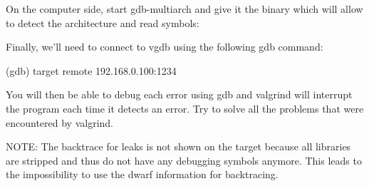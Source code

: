On the computer side, start gdb-multiarch and give it the 
binary which will allow to detect the architecture and read symbols:

Finally, we'll need to connect to vgdb using the following gdb command:
\begin{bashinput}
(gdb) target remote 192.168.0.100:1234
\end{bashinput}

You will then be able to debug each error using gdb and valgrind will interrupt
the program each time it detects an error. Try to solve all the problems that
were encountered by valgrind.

NOTE: The backtrace for leaks is not shown on the target because all libraries
are stripped and thus do not have any debugging symbols anymore. This leads to
the impossibility to use the dwarf information for backtracing.
